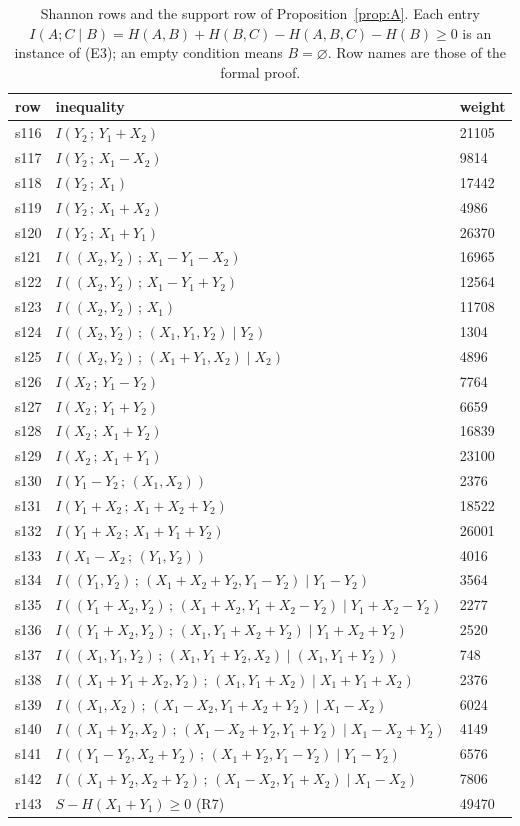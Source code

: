 \documentclass[11pt]{amsart}
\theoremstyle{definition}
\theoremstyle{remark}
\numberwithin{equation}{section}
\begin{document}
\begin{table}[ht]
\small
\caption{Shannon rows and the support row of Proposition~\ref{prop:A}. Each entry
$I(A;C\mid B)=H(A,B)+H(B,C)-H(A,B,C)-H(B)\ge0$ is an instance of (E3); an empty condition means
$B=\varnothing$. Row names are those of the formal proof.}\label{tab:shannon}
\begin{tabular}{@{}lll@{}}
\toprule
row & inequality & weight\\
\midrule
s116 & $I(Y_2\,;\,Y_1+X_2)$ & 21105 \\
s117 & $I(Y_2\,;\,X_1-X_2)$ & 9814 \\
s118 & $I(Y_2\,;\,X_1)$ & 17442 \\
s119 & $I(Y_2\,;\,X_1+X_2)$ & 4986 \\
s120 & $I(Y_2\,;\,X_1+Y_1)$ & 26370 \\
s121 & $I((X_2,Y_2)\,;\,X_1-Y_1-X_2)$ & 16965 \\
s122 & $I((X_2,Y_2)\,;\,X_1-Y_1+Y_2)$ & 12564 \\
s123 & $I((X_2,Y_2)\,;\,X_1)$ & 11708 \\
s124 & $I((X_2,Y_2)\,;\,(X_1,Y_1,Y_2)\mid Y_2)$ & 1304 \\
s125 & $I((X_2,Y_2)\,;\,(X_1+Y_1,X_2)\mid X_2)$ & 4896 \\
s126 & $I(X_2\,;\,Y_1-Y_2)$ & 7764 \\
s127 & $I(X_2\,;\,Y_1+Y_2)$ & 6659 \\
s128 & $I(X_2\,;\,X_1+Y_2)$ & 16839 \\
s129 & $I(X_2\,;\,X_1+Y_1)$ & 23100 \\
s130 & $I(Y_1-Y_2\,;\,(X_1,X_2))$ & 2376 \\
s131 & $I(Y_1+X_2\,;\,X_1+X_2+Y_2)$ & 18522 \\
s132 & $I(Y_1+X_2\,;\,X_1+Y_1+Y_2)$ & 26001 \\
s133 & $I(X_1-X_2\,;\,(Y_1,Y_2))$ & 4016 \\
s134 & $I((Y_1,Y_2)\,;\,(X_1+X_2+Y_2,Y_1-Y_2)\mid Y_1-Y_2)$ & 3564 \\
s135 & $I((Y_1+X_2,Y_2)\,;\,(X_1+X_2,Y_1+X_2-Y_2)\mid Y_1+X_2-Y_2)$ & 2277 \\
s136 & $I((Y_1+X_2,Y_2)\,;\,(X_1,Y_1+X_2+Y_2)\mid Y_1+X_2+Y_2)$ & 2520 \\
s137 & $I((X_1,Y_1,Y_2)\,;\,(X_1,Y_1+Y_2,X_2)\mid (X_1,Y_1+Y_2))$ & 748 \\
s138 & $I((X_1+Y_1+X_2,Y_2)\,;\,(X_1,Y_1+X_2)\mid X_1+Y_1+X_2)$ & 2376 \\
s139 & $I((X_1,X_2)\,;\,(X_1-X_2,Y_1+X_2+Y_2)\mid X_1-X_2)$ & 6024 \\
s140 & $I((X_1+Y_2,X_2)\,;\,(X_1-X_2+Y_2,Y_1+Y_2)\mid X_1-X_2+Y_2)$ & 4149 \\
s141 & $I((Y_1-Y_2,X_2+Y_2)\,;\,(X_1+Y_2,Y_1-Y_2)\mid Y_1-Y_2)$ & 6576 \\
s142 & $I((X_1+Y_2,X_2+Y_2)\,;\,(X_1-X_2,Y_1+X_2)\mid X_1-X_2)$ & 7806 \\
\midrule
r143 & $S-H(X_1+Y_1)\ge0$ \quad (R7) & 49470 \\
\bottomrule
\end{tabular}
\end{table}
\end{document}
